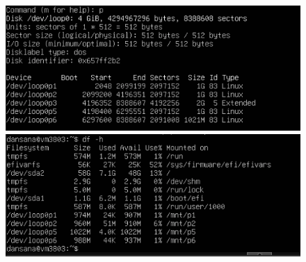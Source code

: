 \documentclass[10pt]{article}
\begin{document}
\begin{itemize}
		\begin{figure}[H]
			\centering
			\begin{minipage}{0.48\textwidth}
				\centering
				\includegraphics[width=\linewidth]{Recursos/particiones1.png}
			\end{minipage}\hfill
			\begin{minipage}{0.48\textwidth}
				\centering
				\includegraphics[width=\linewidth]{Recursos/particiones2.png}
			\end{minipage}
		\end{figure}
	\end{itemize}
	
\end{document}
